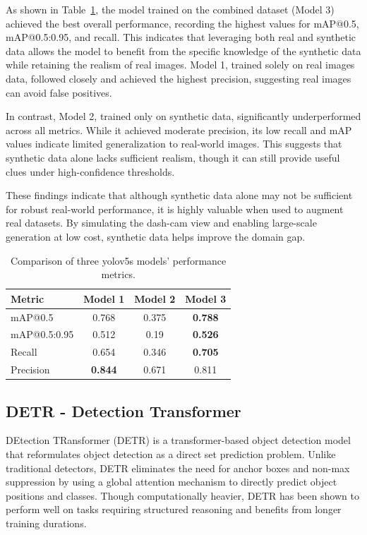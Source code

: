\documentclass[journal]{IEEEtran}
\begin{document}
As shown in Table~\ref{tab:model_comparison}, the model trained on the combined dataset (Model 3) achieved the best overall performance, recording the highest values for mAP@0.5, mAP@0.5:0.95, and recall. This indicates that leveraging both real and synthetic data allows the model to benefit from the specific knowledge of the synthetic data while retaining the realism of real images. Model 1, trained solely on real images data, followed closely and achieved the highest precision, suggesting real images can avoid false positives.

In contrast, Model 2, trained only on synthetic data, significantly underperformed across all metrics. While it achieved moderate precision, its low recall and mAP values indicate limited generalization to real-world images. This suggests that synthetic data alone lacks sufficient realism, though it can still provide useful clues under high-confidence thresholds.

These findings indicate that although synthetic data alone may not be sufficient for robust real-world performance, it is highly valuable when used to augment real datasets. By simulating the dash-cam view and enabling large-scale generation at low cost, synthetic data helps improve the domain gap.



\begin{table}[ht]
\centering
\begin{tabular}{|l|c|c|c|}
\hline
\textbf{Metric} & \textbf{Model 1} & \textbf{Model 2} & \textbf{Model 3} \\
\hline
mAP@0.5 & 0.768 & 0.375 &  \textbf{0.788}\\
mAP@0.5:0.95 & 0.512 & 0.19 & \textbf{0.526}\\
Recall & 0.654 & 0.346 & \textbf{0.705}\\
Precision & \textbf{0.844} & 0.671& 0.811 \\
\hline
\end{tabular}
\caption{Comparison of three yolov5s models' performance metrics.}
\label{tab:model_comparison}
\end{table}

\subsection{DETR - Detection Transformer}
DEtection TRansformer (DETR) is a transformer-based object detection model that reformulates object detection as a direct set prediction problem. Unlike traditional detectors, DETR eliminates the need for anchor boxes and non-max suppression by using a global attention mechanism to directly predict object positions and classes. Though computationally heavier, DETR has been shown to perform well on tasks requiring structured reasoning and benefits from longer training durations.
\end{document}
